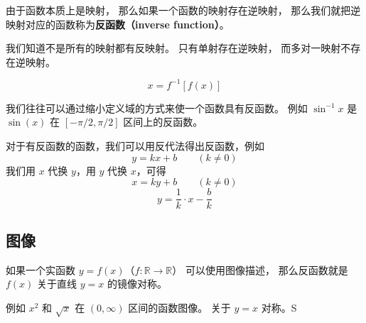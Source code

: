
\begin{issues}
\issueDraft
\end{issues}

由于函数本质上是映射， 那么如果一个函数的映射存在逆映射， 那么我们就把逆映射对应的函数称为\textbf{反函数（inverse function）}。

我们知道不是所有的映射都有反映射。 只有单射存在逆映射， 而多对一映射不存在逆映射。

\begin{equation}
x = f^{-1}[f(x)]
\end{equation}

我们往往可以通过缩小定义域的方式来使一个函数具有反函数。 例如 $\sin^{-1} x$ 是 $\sin(x)$ 在 $[-\pi/2, \pi/2]$ 区间上的反函数。

对于有反函数的函数，我们可以用反代法得出反函数，例如
\begin{equation}
y = kx + b \qquad (k \ne 0)
\end{equation}
我们用 $x$ 代换 $y$，用 $y$ 代换 $x$，可得
\begin{equation}
x = ky + b \qquad (k \ne 0)
\end{equation}
\begin{equation}
y = \frac{1}{k} \cdot x - \frac{b}{k}
\end{equation}

\subsection{图像}
如果一个实函数 $y = f(x)$（$f: \mathbb R \to \mathbb R$） 可以使用图像描述， 那么反函数就是 $f(x)$ 关于直线 $y = x$ 的镜像对称。

例如 $x^2$ 和 $\sqrt{x}$ 在 $(0, \infty)$ 区间的函数图像。 关于 $y = x$ 对称。S